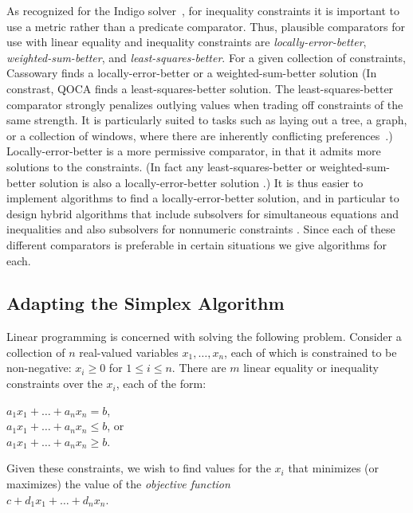 \documentclass{article}
\begin{document}
As recognized for the Indigo solver~\cite{borning-uist-96},
for inequality constraints it is important to use a metric rather than a
predicate comparator.  Thus, plausible comparators for use with linear
equality and inequality constraints are {\em locally-error-better}, 
{\em weighted-sum-better}, and {\em least-squares-better}.  
For a given
collection of constraints, Cassowary finds a locally-error-better or a
weighted-sum-better solution
(In constrast, QOCA finds a least-squares-better solution.
The least-squares-better comparator strongly
penalizes outlying values when trading off constraints of the same
strength.  It is particularly suited to tasks such as laying out a tree, a
graph, or a collection of windows, where there are inherently conflicting
preferences~\cite{borning-simplex-tr}.)
Locally-error-better is a more permissive
comparator, in that it admits more solutions to the constraints.  (In fact
any least-squares-better or weighted-sum-better solution is also a
locally-error-better solution \cite{borning-lisp-symbolic-computation-92}.)
It is thus easier to implement algorithms to find a locally-error-better
solution, and in particular to design hybrid algorithms that include
subsolvers for simultaneous equations and inequalities and also subsolvers
for nonnumeric constraints \cite{borning-cp-95}.
Since each of these different comparators is preferable in certain
situations we  give algorithms for each.

\subsection{Adapting the Simplex Algorithm}

Linear programming is concerned with solving the following problem.  Consider
a collection of $n$ real-valued variables $x_1, \ldots, x_n$, each
of which  is constrained to be non-negative: 
$x_i \geq 0$ for $1 \leq i \leq n$.  There are  $m$
linear equality or inequality constraints over the $x_i$, each of the form:

\hspace*{5mm}\mbox{$a_1 x_1 + \ldots + a_n x_n = b$},\\
\hspace*{5mm}\mbox{$a_1 x_1 + \ldots + a_n x_n \leq b$},  or\\
\hspace*{5mm}\mbox{$a_1 x_1 + \ldots + a_n x_n \geq b$}.

Given these constraints, we wish to find values for the $x_i$ that minimizes 
(or maximizes) the value of the {\em objective function} \\
\vspace*{2mm}
\hspace*{5mm}$c + d_1 x_1 + \ldots + d_n x_n$.
\end{document}
